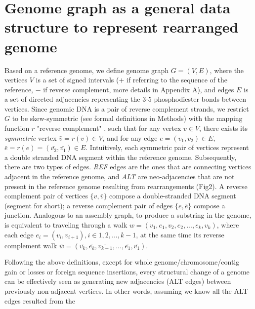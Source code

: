 \documentclass[phd,tocprelim]{cornell}
\begin{document}
\section{Genome graph as a general data structure to represent rearranged genome}
Based on a reference genome, we define genome graph $G = (V, E)$, where the vertices $V$ is a set of signed intervals ($+$ if referring to the sequence of the reference, $-$ if reverse complement, more details in Appendix A), and edges $E$ is a set of directed adjacencies representing the 3-5 phosphodiester bonds between vertices. Since genomic DNA is a pair of reverse complement strands, we restrict $G$ to be skew-symmetric (see formal definitions in Methods) with the mapping function $r$ "reverse complement" \cite{Goldberg1996-qm}, such that for any vertex $v \in V$, there exists its \textit{symmetric} vertex $\bar{v} = r(v) \in V$, and for any edge $e = (v_1, v_2) \in E$, $\bar{e} = r(e) = (\bar{v_2}, \bar{v_1}) \in E$. Intuitively, each symmetric pair of vertices represent a double stranded DNA segment within the reference genome. Subsequently, there are two types of edges. \textit{REF} edges are the ones that are connecting vertices adjacent in the reference genome, and \textit{ALT} are neo-adjacencies that are not present in the reference genome resulting from rearrangements (Fig2). A reverse complement pair of vertices $\{v, \bar{v}\}$ compose a double-stranded DNA segment (segment for short); a reverse complement pair of edges $\{e, \bar{e}\}$ compose a junction. Analogous to an assembly graph, to produce a substring in the genome, is equivalent to traveling through a walk $w = (v_1, e_1, v_2, e_2, ..., e_k, v_k)$, where each edge $e_i = (v_i, v_{i+1}), i \in 1, 2, ..., k-1$, at the same time its reverse complement walk $\bar{w} = (\bar{v_k}, \bar{e_k}, \bar{v_{k-1}}, ..., \bar{e_1}, \bar{v_1})$.

% 
Following the above definitions, except for whole genome/chromosome/contig gain or losses or foreign sequence insertions, every structural change of a genome can be effectively seen as generating new adjacencies (ALT edges) between previously non-adjacent vertices. In other words, assuming we know all the ALT edges resulted from the 

\end{document}
